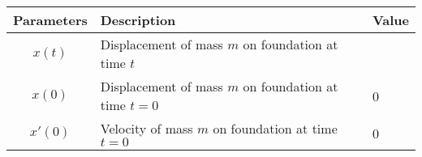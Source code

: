 \begin{tabular}{|c|p{4cm}|p{1.5cm}|}
\hline
\textbf{Parameters} & \textbf{Description} & \textbf{Value} \\
\hline
$x(t)$ & Displacement of mass $m$ on foundation at time $t$ & \\
\hline
$x(0)$ & Displacement of mass $m$ on foundation at time $t=0$ & 0 \\
\hline
$x'(0)$ & Velocity of mass $m$ on foundation at time $t=0$ & 0\\
\hline
\end{tabular}
